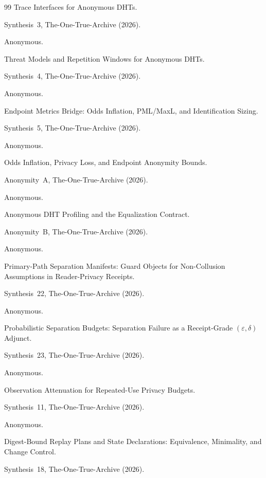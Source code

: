 \documentclass[11pt]{article}
\begin{document}
\begin{thebibliography}{99}
\newblock Trace Interfaces for Anonymous DHTs.

\newblock Synthesis~3, The-One-True-Archive (2026).

Anonymous.

\newblock Threat Models and Repetition Windows for Anonymous DHTs.

\newblock Synthesis~4, The-One-True-Archive (2026).

Anonymous.

\newblock Endpoint Metrics Bridge: Odds Inflation, PML/MaxL, and Identification Sizing.

\newblock Synthesis~5, The-One-True-Archive (2026).

Anonymous.

\newblock Odds Inflation, Privacy Loss, and Endpoint Anonymity Bounds.

\newblock Anonymity~A, The-One-True-Archive (2026).

Anonymous.

\newblock Anonymous DHT Profiling and the Equalization Contract.

\newblock Anonymity~B, The-One-True-Archive (2026).

Anonymous.

\newblock Primary-Path Separation Manifests: Guard Objects for Non-Collusion Assumptions in Reader-Privacy Receipts.

\newblock Synthesis~22, The-One-True-Archive (2026).

Anonymous.

\newblock Probabilistic Separation Budgets: Separation Failure as a Receipt-Grade $(\varepsilon,\delta)$ Adjunct.

\newblock Synthesis~23, The-One-True-Archive (2026).

Anonymous.

\newblock Observation Attenuation for Repeated-Use Privacy Budgets.

\newblock Synthesis~11, The-One-True-Archive (2026).


Anonymous.

\newblock Digest-Bound Replay Plans and State Declarations: Equivalence, Minimality, and Change Control.

\newblock Synthesis~18, The-One-True-Archive (2026).


\end{thebibliography}
\end{document}
